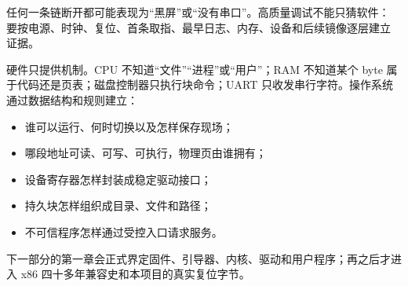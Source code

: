 任何一条链断开都可能表现为“黑屏”或“没有串口”。高质量调试不能只猜软件：
要按电源、时钟、复位、首条取指、最早日志、内存、设备和后续镜像逐层建立
证据。

硬件只提供机制。CPU 不知道“文件”“进程”或“用户”；RAM 不知道某个 byte
属于代码还是页表；磁盘控制器只执行块命令；UART 只收发串行字符。操作系统
通过数据结构和规则建立：

\begin{itemize}[leftmargin=2.2em]
  \item 谁可以运行、何时切换以及怎样保存现场；
  \item 哪段地址可读、可写、可执行，物理页由谁拥有；
  \item 设备寄存器怎样封装成稳定驱动接口；
  \item 持久块怎样组织成目录、文件和路径；
  \item 不可信程序怎样通过受控入口请求服务。
\end{itemize}

下一部分的第一章会正式界定固件、引导器、内核、驱动和用户程序；再之后才进入
x86 四十多年兼容史和本项目的真实复位字节。


